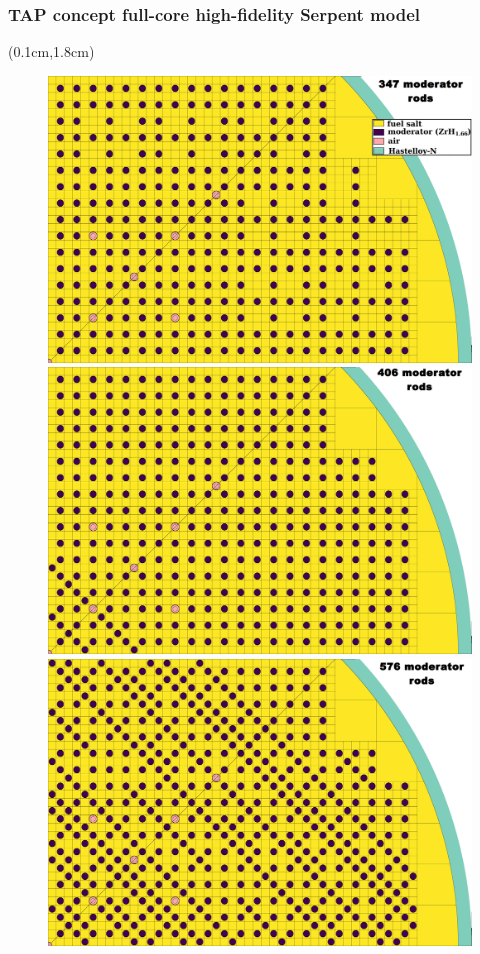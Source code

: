 \begin{frame}
\frametitle{\gls{TAP} concept full-core high-fidelity Serpent model}
\begin{textblock*}{12.6cm}(0.1cm,1.8cm) %
\begin{figure}[htp!] %
	\begin{overprint}
		\centerline{\includegraphics[height=0.75\textheight]{./images/347_base_2.png}}
		\centerline{\includegraphics[height=0.75\textheight]{./images/406.png}}
		\centerline{\includegraphics[height=0.75\textheight]{./images/576.png}}

\end{overprint}
\end{figure}
\end{textblock*}
\end{frame}
